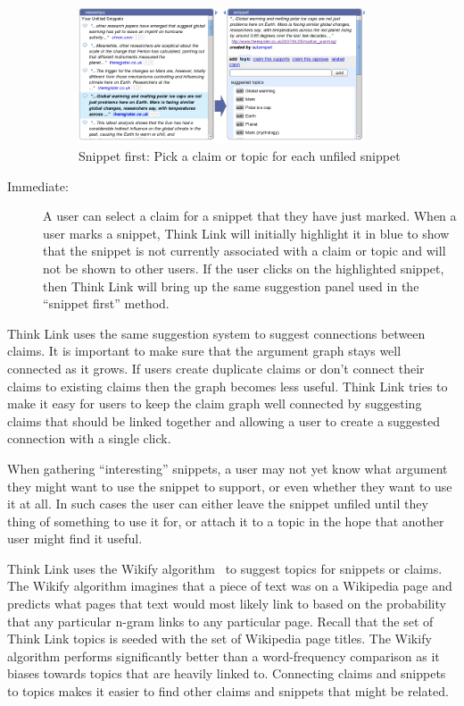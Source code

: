 \documentclass{chi2009}
\newcommand{\todo}[1]{}
\begin{document}
\begin{description}
\todo{Updated screenshot with ``enter new claim or search keywords'' present}

\begin{figure}[tb]
	\begin{center}
	\includegraphics[width=8.5cm]{../screenshots/v2_sniptopic.png}
	\caption{Snippet first: Pick a claim or topic for each unfiled snippet}
	\label{sniptopic}
	\end{center}
\end{figure}

\item[Immediate:] A user can select a claim for a snippet that they have just marked. When a user marks a snippet, Think Link will initially highlight it in blue to show that the snippet is not currently associated with a claim or topic and will not be shown to other users. If the user clicks on the highlighted snippet, then Think Link will bring up the same suggestion panel used in the ``snippet first'' method.
\end{description}

Think Link uses the same suggestion system to suggest connections between claims. It is important to make sure that the argument graph stays well connected as it grows. If users create duplicate claims or don't connect their claims to existing claims then the graph becomes less useful. Think Link tries to make it easy for users to keep the claim graph well connected by suggesting claims that should be linked together and allowing a user to create a suggested connection with a single click. 

When gathering ``interesting'' snippets, a user may not yet know what argument they might want to use the snippet to support, or even whether they want to use it at all. In such cases the user can either leave the snippet unfiled until they thing of something to use it for, or attach it to a topic in the hope that another user might find it useful.

Think Link uses the Wikify algorithm~\cite{Mihalcea2007} to suggest topics for snippets or claims. The Wikify algorithm imagines that a piece of text was on a Wikipedia page and predicts what pages that text would most likely link to based on the probability that any particular n-gram links to any particular page. Recall that the set of Think Link topics is seeded with the set of Wikipedia page titles. The Wikify algorithm performs significantly better than a word-frequency comparison as it biases towards topics that are heavily linked to. Connecting claims and snippets to topics makes it easier to find other claims and snippets that might be related.
\end{document}
